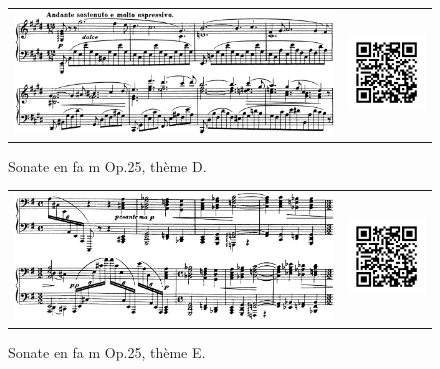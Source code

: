 \begin{figure}[!p]
  \begin{bigcenter}
    \begin{tabular}{lr}
      \includegraphics[width=12.5cm, keepaspectratio]{sonate-theme-D.png}
      &
      \includegraphics[width=3cm, keepaspectratio]{op1-qr.png}
    \end{tabular}
  \end{bigcenter}
  \caption{\label{sonate-theme-1}Sonate en fa m Op.25, thème D.}
\end{figure}

\begin{figure}[!p]
  \begin{bigcenter}
    \begin{tabular}{lr}
      \includegraphics[width=12.5cm, keepaspectratio]{sonate-theme-E.png}
      &
      \includegraphics[width=3cm, keepaspectratio]{op1-qr.png}
    \end{tabular}
  \end{bigcenter}
  \caption{\label{sonate-theme-1}Sonate en fa m Op.25, thème E.}
\end{figure}

